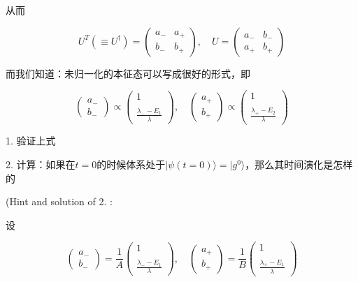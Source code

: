 从而

\begin{equation}
U^T(\equiv U^\dagger) = \left(\begin{matrix}a_- & a_+\\b_- & b_+\end{matrix}\right), \quad U = \left(\begin{matrix}a_- & b_-\\a_+ & b_+\end{matrix}\right)
\end{equation}

而我们知道：未归一化的本征态可以写成很好的形式，即

\begin{equation}
\left(\begin{matrix}a_-\\b_-\end{matrix}\right) \propto \left(\begin{matrix}1 \\ \ \\ \displaystyle\frac{\lambda_- - E_1}{\lambda}\end{matrix}\right),\quad \left(\begin{matrix}a_+\\b_+\end{matrix}\right) \propto \left(\begin{matrix}1 \\ \ \\ \displaystyle\frac{\lambda_+ - E_2}{\lambda}\end{matrix}\right)
\end{equation}

1. 验证上式

2. 计算：如果在$t=0$的时候体系处于$|\psi(t=0)\rangle = |g^0\rangle$，那么其时间演化是怎样的

(Hint and solution of 2. :

设

\begin{equation}
\left(\begin{matrix}a_-\\b_-\end{matrix}\right) =\frac{1}{A} \left(\begin{matrix}1 \\ \ \\ \displaystyle\frac{\lambda_- - E_1}{\lambda}\end{matrix}\right),\quad \left(\begin{matrix}a_+\\b_+\end{matrix}\right) =\frac{1}{B} \left(\begin{matrix}1 \\ \ \\ \displaystyle\frac{\lambda_+ - E_1}{\lambda}\end{matrix}\right) 
\end{equation}

